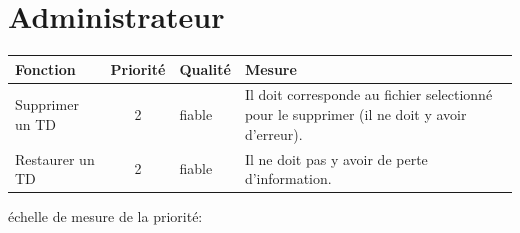 \section*{Administrateur}


\begin{tabular}{|p{4cm}|c|p{4cm}|p{5cm}|}
\hline
Fonction & Priorit{\'e} & Qualit{\'e} & Mesure \\
\hline
Supprimer un TD & 2 & fiable & Il doit corresponde au fichier selectionn{\'e} pour le supprimer (il ne doit y avoir d'erreur).\\
\hline
Restaurer un TD & 2 & fiable & Il ne doit pas y avoir de perte d'information.\\
\hline
\end{tabular}

\begin{center}
{\'e}chelle de mesure de la priorit{\'e}:

\end{center}

